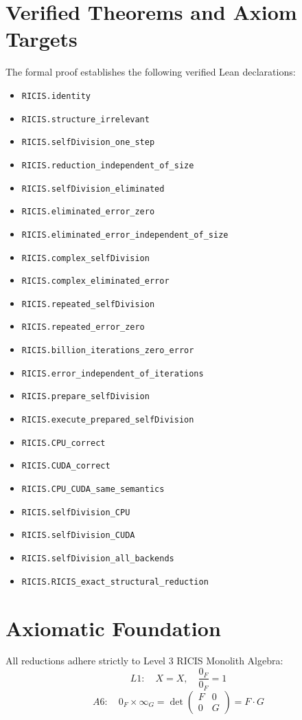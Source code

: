 \documentclass[11pt,a4paper]{article}
\begin{document}
\section{Verified Theorems and Axiom Targets}
The formal proof establishes the following verified Lean declarations:
\begin{itemize}
  \item \texttt{RICIS.identity}
  \item \texttt{RICIS.structure_irrelevant}
  \item \texttt{RICIS.selfDivision_one_step}
  \item \texttt{RICIS.reduction_independent_of_size}
  \item \texttt{RICIS.selfDivision_eliminated}
  \item \texttt{RICIS.eliminated_error_zero}
  \item \texttt{RICIS.eliminated_error_independent_of_size}
  \item \texttt{RICIS.complex_selfDivision}
  \item \texttt{RICIS.complex_eliminated_error}
  \item \texttt{RICIS.repeated_selfDivision}
  \item \texttt{RICIS.repeated_error_zero}
  \item \texttt{RICIS.billion_iterations_zero_error}
  \item \texttt{RICIS.error_independent_of_iterations}
  \item \texttt{RICIS.prepare_selfDivision}
  \item \texttt{RICIS.execute_prepared_selfDivision}
  \item \texttt{RICIS.CPU_correct}
  \item \texttt{RICIS.CUDA_correct}
  \item \texttt{RICIS.CPU_CUDA_same_semantics}
  \item \texttt{RICIS.selfDivision_CPU}
  \item \texttt{RICIS.selfDivision_CUDA}
  \item \texttt{RICIS.selfDivision_all_backends}
  \item \texttt{RICIS.RICIS_exact_structural_reduction}
\end{itemize}

\section{Axiomatic Foundation}
All reductions adhere strictly to Level 3 RICIS Monolith Algebra:
\begin{equation}
L1: \quad X = X, \quad \frac{0_F}{0_F} = 1
\end{equation}
\begin{equation}
A6: \quad 0_F \times \infty_G = \det\begin{pmatrix} F & 0 \\ 0 & G \end{pmatrix} = F \cdot G
\end{equation}
\end{document}
